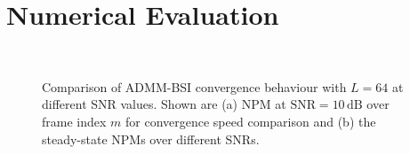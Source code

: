 \documentclass{article}
\begin{document}
\section{Numerical Evaluation}
\label{sec:perf_eval}

\begin{figure}[t]
    \centering
    \hspace*{-0.2cm}\\
    \vspace*{-0.3cm}
    \hspace*{-0.2cm}
    \vspace*{-0.2cm}
    \caption{Comparison of ADMM-BSI convergence behaviour with \(L\!=\!64\) at different SNR values. Shown are (a) NPM at \(\text{SNR}=10\,\text{dB}\) over frame index \(m\) for convergence speed comparison and (b) the steady-state NPMs over different SNRs.}
    \label{fig:perf_eval:NPM_over_time_exp1}
\end{figure}
\end{document}
